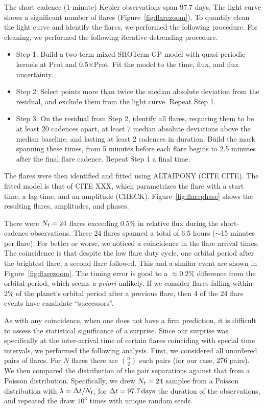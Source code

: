 \documentclass[12pt,modern,twocolumn,tighten]{aastex63}
\begin{document}
The short cadence (1-minute) Kepler observations span 97.7 days.
The light curve shows a significant number of flares
(Figure~\ref{fig:flarezoom}).
To quantify clean the light curve and identify the flares, we
performed the following procedure.
For cleaning, we performed the following iterative detrending procedure.
\begin{itemize}
  \item Step 1: Build a two-term mixed SHOTerm GP model with
    quasi-periodic kernels at Prot and 0.5$\times$Prot. Fit the model
    to the time, flux, and flux uncertainty.
  \item Step 2: Select points more than twice the median absolute
    deviation from the residual, and exclude them from the light
    curve.  Repeat Step 1.
  \item Step 3: On the residual from Step 2, identify all flares,
    requiring them to be at least 20 cadences apart, at least 7 median
    absolute deviations above the median baseline, and lasting at least
    2 cadences in duration.  Build the mask spanning these times, from
    5 minutes before each flare begins to 2.5 minutes after the final
    flare cadence.  Repeat Step 1 a final time.
\end{itemize}
The flares were then identified and fitted using ALTAIPONY (CITE CITE).
The fitted model is that of CITE XXX, which parametrizes the flare
with a start time, a lag time, and an amplitude (CHECK).
Figure~\ref{fig:flarephase} shows the resulting flares, amplitudes,
and phases.

There were $N_{\rm f}=24$ flares exceeding $0.5\%$ in relative flux during the
short-cadence observations.  These 24 flares spanned a total of 6.5
hours ($\sim$15 minutes per flare).  For better or worse, we noticed a
coincidence in the flare arrival times.  The coincidence is that
despite the low flare duty cycle, one orbital period after the
brightest flare, a second flare followed.  This and a similar event
are shown in Figure~\ref{fig:flarezoom}.  The timing error is good to
a $\approx0.2\%$ difference from the orbital period, which seems {\it
a priori} unlikely.  If we consider flares falling within 2\% of the
planet's orbital period after a previous flare, then 4 of the 24 flare
events have candidate ``successors''.

As with any coincidence, when one does not have a firm prediction, it
is difficult to assess the statistical significance of a surprise.
Since our surprise was specifically at the inter-arrival time of
certain flares coinciding with special time intervals, we performed
the following analysis.  First, we considered all unordered pairs of
flares.  For $N$ flares there are ${n \choose 2}$ such pairs (for our
case, 276 pairs).  We then compared the distribution of the pair
separations against that from a Poisson distribution.  Specifically,
we drew $N_{\rm f}=24$ samples from a Poisson distribution with
$\lambda = \Delta t / N_{\rm f}$, for $\Delta t=97.7\,{\rm days}$ the
duration of the observations, and repeated the draw $10^3$ times with
unique random seeds.
\end{document}
